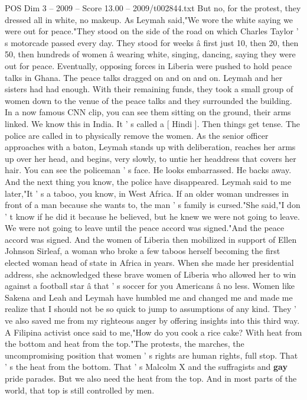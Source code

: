\begin{textsample}{POS Dim 3 – 2009 – Score 13.00 – 2009/t002844.txt}
But no, for the protest, they dressed all in white, no makeup.
As Leymah said,"We wore the white saying we were out for peace."They stood on the side of the road on which Charles Taylor ' s motorcade passed every day.
They stood for weeks â first just 10, then 20, then 50, then hundreds of women â wearing white, singing, dancing, saying they were out for peace.
Eventually, opposing forces in Liberia were pushed to hold peace talks in Ghana.
The peace talks dragged on and on and on.
Leymah and her sisters had had enough.
With their remaining funds, they took a small group of women down to the venue of the peace talks and they surrounded the building.
In a now famous CNN clip, you can see them sitting on the ground, their arms linked.
We know this in India.
It ' s called a [ Hindi ].
Then things get tense.
The police are called in to physically remove the women.
As the senior officer approaches with a baton, Leymah stands up with deliberation, reaches her arms up over her head, and begins, very slowly, to untie her headdress that covers her hair.
You can see the policeman ' s face.
He looks embarrassed.
He backs away.
And the next thing you know, the police have disappeared.
Leymah said to me later,"It ' s a taboo, you know, in West Africa.
If an older woman undresses in front of a man because she wants to, the man ' s family is cursed."She said,"I don ' t know if he did it because he believed, but he knew we were not going to leave.
We were not going to leave until the peace accord was signed."And the peace accord was signed.
And the women of Liberia then mobilized in support of Ellen Johnson Sirleaf, a woman who broke a few taboos herself becoming the first elected woman head of state in Africa in years.
When she made her presidential address, she acknowledged these brave women of Liberia who allowed her to win against a football star â that ' s soccer for you Americans â no less.
Women like Sakena and Leah and Leymah have humbled me and changed me and made me realize that I should not be so quick to jump to assumptions of any kind.
They ' ve also saved me from my righteous anger by offering insights into this third way.
A Filipina activist once said to me,"How do you cook a rice cake?
With heat from the bottom and heat from the top."The protests, the marches, the uncompromising position that women ' s rights are human rights, full stop.
That ' s the heat from the bottom.
That ' s Malcolm X and the suffragists and \textbf{gay} pride parades.
But we also need the heat from the top.
And in most parts of the world, that top is still controlled by men.

\end{textsample}
